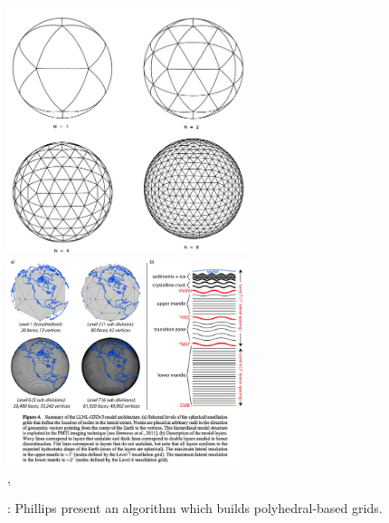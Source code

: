 \begin{center}
\includegraphics[width=7cm]{images/meshes/bafr85}
\includegraphics[width=7cm]{images/meshes/simj12}\\
{\captionfont \cite{bafr85}, \cite{simj12}}
\end{center}


\Literature: Phillips \etal \cite{phdo19} present an algorithm which builds polyhedral-based grids.





